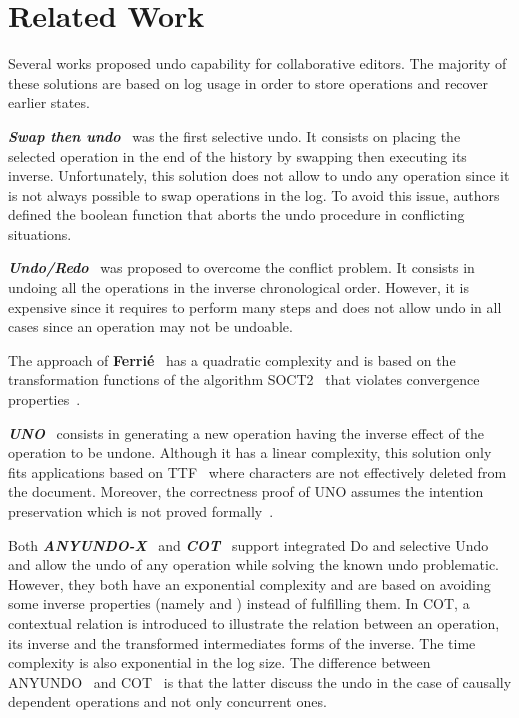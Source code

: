 \documentclass[submission,copyright,creativecommons]{eptcs}
\begin{document}
 

\section{Related Work}
Several works proposed undo capability for   collaborative editors.
The majority of these solutions are based on log usage in order to store operations and recover earlier states.

\emph{\textbf{Swap then undo}}~\cite{Atul94} was the first selective undo. It consists on  placing the selected
operation in the end of the history by swapping then executing its inverse.
Unfortunately, this solution does not allow to undo any operation since it is not always possible to swap operations in the log.   To avoid this issue, authors defined the boolean function   that aborts the undo procedure in conflicting situations.


\emph{\textbf{Undo/Redo}}~\cite{Ressel99} was proposed to overcome the conflict problem. It consists in undoing all the operations in the inverse chronological
order.
However, it is expensive since it requires to perform many steps and does
not allow undo in all cases since an operation may  not be undoable.


The approach of \textbf{Ferri\'e}~\cite{Ferrie04}   has a quadratic complexity and is based on  the transformation functions of the algorithm SOCT2~\cite{suleiman97} that violates convergence properties~\cite{ImineMOR03, Imi06}.


\textbf{\emph{UNO}}~\cite{WEISS:2008} consists in generating a new operation having the inverse effect of the operation to be undone. Although it has a linear complexity,   this solution only fits applications based on TTF~\cite{Oster06}   where characters are not effectively deleted from the document. Moreover,   the correctness proof of UNO assumes the intention preservation which is not proved formally~\cite{BinShao10}.




Both \textbf{\emph{ANYUNDO-X}}~\cite{Sun02}  and \textbf{\emph{COT}}~\cite{SunS09} support integrated Do and selective Undo and allow the undo
of any operation while solving the known undo problematic. However, they both have an exponential complexity and are based on avoiding some  inverse properties (namely  and ) instead of fulfilling them.
In COT, a contextual relation is introduced to illustrate the relation between an operation, its inverse and the transformed intermediates forms of the inverse. The time complexity is also exponential in the log size.
The difference between ANYUNDO~\cite{Sun02} and COT~\cite{SunS09} is that the latter discuss the undo in the case of causally dependent operations and not only concurrent ones. 
\end{document}

